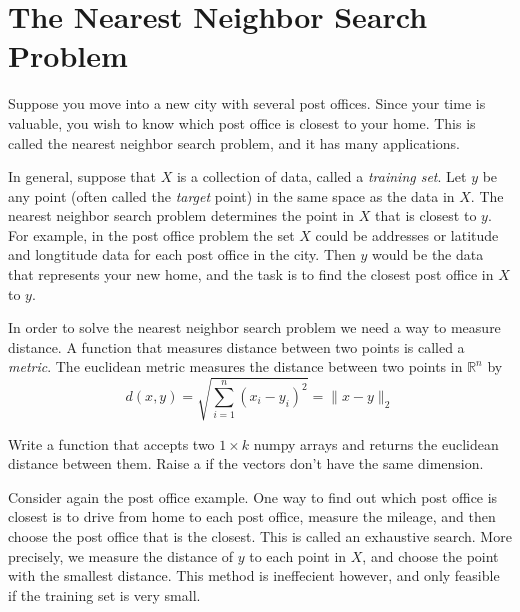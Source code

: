 \label{lab:NNS}


\section*{The Nearest Neighbor Search Problem}

Suppose you move into a new city with several post offices.
Since your time is valuable, you wish to know which post office is closest to your home.
This is called the nearest neighbor search problem, and it has many applications.

In general, suppose that $X$ is a collection of data, called a \emph{training set}.
Let $y$ be any point (often called the \emph{target} point) in the same space as the data in $X$.
The nearest neighbor search problem determines the point in $X$ that is closest to $y$.
For example, in the post office problem the set $X$ could be addresses or latitude and longtitude data for each post office in the city.
Then $y$ would be the data that represents your new home, and the task is to find the closest post office in $X$ to $y$.

\begin{problem}
In order to solve the nearest neighbor search problem we need a way to measure distance.
A function that measures distance between two points is called a \emph{metric}.
The euclidean metric measures the distance between two points in $\mathbb{R}^n$ by
\[
d(x,y) = \sqrt{\displaystyle\sum_{i=1}^n (x_i - y_i)^2} = \| x - y \|_2
\]

Write a function that accepts two $1 \times k$ numpy arrays and returns the euclidean distance between them.
Raise a  if the vectors don't have the same dimension.
\end{problem}

Consider again the post office example.
One way to find out which post office is closest is to drive from home to each post office, measure the mileage, and then choose the post office that is the closest.
This is called an exhaustive search.
More precisely, we measure the distance of $y$ to each point in $X$, and choose the point with the smallest distance.
This method is ineffecient however, and only feasible if the training set is very small.

